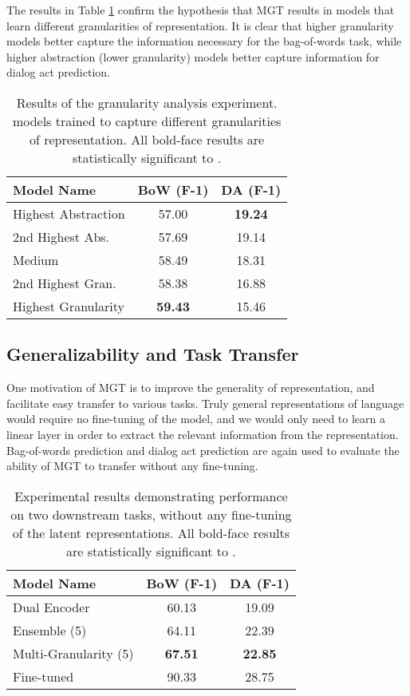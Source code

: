 \documentclass[11pt,a4paper]{article}
\begin{document}
The results in Table \ref{granularity} confirm the hypothesis that MGT results in models that learn different granularities of representation. It is clear that higher granularity models better capture the information necessary for the bag-of-words task, while higher abstraction (lower granularity) models better capture information for dialog act prediction.


\begin{table}[]
\centering
\begin{tabular}{|l|c|c|}
\hline
\textbf{Model Name}             & \textbf{BoW (F-1)} & \textbf{DA (F-1)} \\ \hline
Highest Abstraction             & 57.00        & \textbf{19.24}         \\ 
2nd Highest Abs.         & 57.69        & 19.14         \\ 
Medium                          & 58.49        & 18.31         \\ 
2nd Highest Gran.         & 58.38        & 16.88         \\ 
Highest Granularity             & \textbf{59.43}        & 15.46         \\  \hline
\end{tabular}
\caption{Results of the granularity analysis experiment.  models trained to capture different granularities of representation. All bold-face results are statistically significant to .}
\label{granularity}
\end{table}

\subsection{Generalizability and Task Transfer}

One motivation of MGT is to improve the generality of representation, and facilitate easy transfer to various tasks. Truly general representations of language would require no fine-tuning of the model, and we would only need to learn a linear layer in order to extract the relevant information from the representation. Bag-of-words prediction and dialog act prediction are again used to evaluate the ability of MGT to transfer without any fine-tuning. 


\begin{table}[]
\centering
\begin{tabular}{|l|c|c|}
\hline
\textbf{Model Name}             & \textbf{BoW (F-1)} & \textbf{DA (F-1)} \\ \hline
Dual Encoder             & 60.13        & 19.09         \\ 
Ensemble (5)         & 64.11        & 22.39     \\ 
Multi-Granularity (5)                          & \textbf{67.51}        & \textbf{22.85}         \\ \hline
Fine-tuned  & 90.33 & 28.75 \\ \hline
\end{tabular}
\caption{Experimental results demonstrating performance on two downstream tasks, without any fine-tuning of the latent representations. All bold-face results are statistically significant to .}
\label{finetune}
\end{table}
\end{document}
